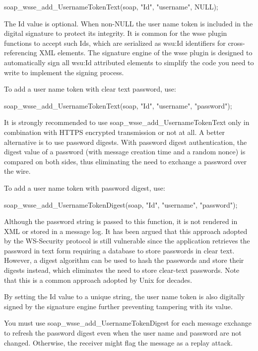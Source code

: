 \begin{DoxyCode}
    soap_wsse_add_UsernameTokenText(soap, "Id", "username", NULL);
\end{DoxyCode}


The Id value is optional. When non-\/NULL the user name token is included in the digital signature to protect its integrity. It is common for the wsse plugin functions to accept such Ids, which are serialized as wsu:Id identifiers for cross-\/referencing XML elements. The signature engine of the wsse plugin is designed to automatically sign all wsu:Id attributed elements to simplify the code you need to write to implement the signing process.

To add a user name token with clear text password, use:


\begin{DoxyCode}
    soap_wsse_add_UsernameTokenText(soap, "Id", "username", "password");
\end{DoxyCode}


It is strongly recommended to use soap\_\-wsse\_\-add\_\-UsernameTokenText only in combination with HTTPS encrypted transmission or not at all. A better alternative is to use password digests. With password digest authentication, the digest value of a password (with message creation time and a random nonce) is compared on both sides, thus eliminating the need to exchange a password over the wire.

To add a user name token with password digest, use:


\begin{DoxyCode}
    soap_wsse_add_UsernameTokenDigest(soap, "Id", "username", "password");
\end{DoxyCode}


Although the password string is passed to this function, it is not rendered in XML or stored in a message log. It has been argued that this approach adopted by the WS-\/Security protocol is still vulnerable since the application retrieves the password in text form requiring a database to store passwords in clear text. However, a digest algorithm can be used to hash the passwords and store their digests instead, which eliminates the need to store clear-\/text passwords. Note that this is a common approach adopted by Unix for decades.

By setting the Id value to a unique string, the user name token is also digitally signed by the signature engine further preventing tampering with its value.

You must use soap\_\-wsse\_\-add\_\-UsernameTokenDigest for each message exchange to refresh the password digest even when the user name and password are not changed. Otherwise, the receiver might flag the message as a replay attack.

